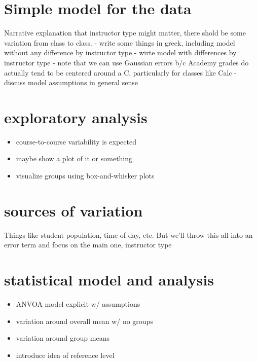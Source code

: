 \documentclass[
]{book}
\providecommand{\tightlist}{%
  \setlength{\itemsep}{0pt}\setlength{\parskip}{0pt}}
\theoremstyle{definition}
\theoremstyle{definition}
\theoremstyle{definition}
\theoremstyle{remark}
\begin{document}
\hypertarget{simple-model-for-the-data}{%
\section{Simple model for the data}\label{simple-model-for-the-data}}

Narrative explanation that instructor type might matter, there shold be some variation from class to class.
- write some things in greek, including model without any difference by instructor type
- wirte model with differences by instructor type
- note that we can use Gaussian errors b/c Academy grades do actually tend to be centered around a C, particularly for classes like Calc
- discuss model assumptions in general sense

\hypertarget{exploratory-analysis}{%
\section{exploratory analysis}\label{exploratory-analysis}}

\begin{itemize}
\tightlist
\item
  course-to-course variability is expected
\item
  maybe show a plot of it or something
\item
  visualize groups using box-and-whisker plots
\end{itemize}

\hypertarget{sources-of-variation-1}{%
\section{sources of variation}\label{sources-of-variation-1}}

Things like student population, time of day, etc. But we'll throw this all into an error term and focus on the main one, instructor type

\hypertarget{statistical-model-and-analysis}{%
\section{statistical model and analysis}\label{statistical-model-and-analysis}}

\begin{itemize}
\tightlist
\item
  ANVOA model explicit w/ assumptions
\item
  variation around overall mean w/ no groups
\item
  variation around group means
\item
  introduce idea of reference level
\end{itemize}
\end{document}
